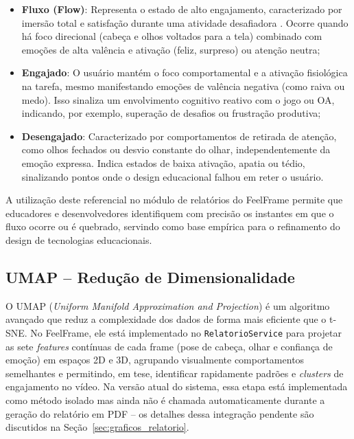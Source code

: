 \documentclass[
	12pt,
	openright,
	oneside,
	a4paper,
	english,
	brazil
	]{abntex2}
\begin{document}
\begin{itemize}
    \item \textbf{Fluxo (Flow)}: Representa o estado de alto engajamento, caracterizado por imersão total e satisfação durante uma atividade desafiadora \cite{csikszentmihalyi1990flow}. Ocorre quando há foco direcional (cabeça e olhos voltados para a tela) combinado com emoções de alta valência e ativação (feliz, surpreso) ou atenção neutra;
    \item \textbf{Engajado}: O usuário mantém o foco comportamental e a ativação fisiológica na tarefa, mesmo manifestando emoções de valência negativa (como raiva ou medo). Isso sinaliza um envolvimento cognitivo reativo com o jogo ou OA, indicando, por exemplo, superação de desafios ou frustração produtiva;
    \item \textbf{Desengajado}: Caracterizado por comportamentos de retirada de atenção, como olhos fechados ou desvio constante do olhar, independentemente da emoção expressa. Indica estados de baixa ativação, apatia ou tédio, sinalizando pontos onde o design educacional falhou em reter o usuário.
\end{itemize}

A utilização deste referencial no módulo de relatórios do FeelFrame permite que educadores e desenvolvedores identifiquem com precisão os instantes em que o fluxo ocorre ou é quebrado, servindo como base empírica para o refinamento do design de tecnologias educacionais.

\subsection{UMAP -- Redução de Dimensionalidade}

O UMAP (\textit{Uniform Manifold Approximation and Projection}) \cite{mcinnes2018umap} é um algoritmo avançado que reduz a complexidade dos dados de forma mais eficiente que o t-SNE. No FeelFrame, ele está implementado no \texttt{RelatorioService} para projetar as sete \textit{features} contínuas de cada frame (pose de cabeça, olhar e confiança de emoção) em espaços 2D e 3D, agrupando visualmente comportamentos semelhantes e permitindo, em tese, identificar rapidamente padrões e \textit{clusters} de engajamento no vídeo. Na versão atual do sistema, essa etapa está implementada como método isolado mas ainda não é chamada automaticamente durante a geração do relatório em PDF -- os detalhes dessa integração pendente são discutidos na Seção~\ref{sec:graficos_relatorio}.
\end{document}
